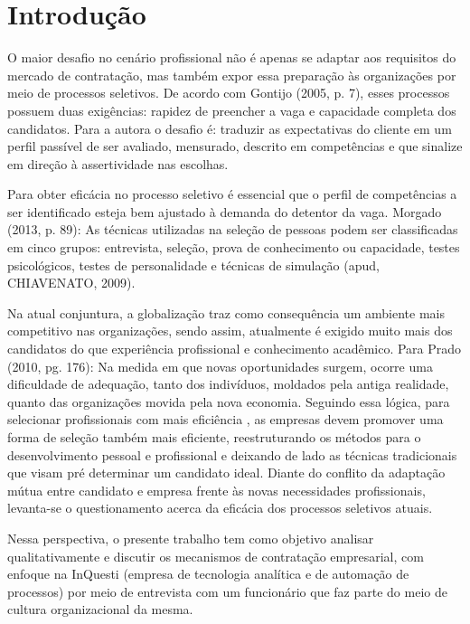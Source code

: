 
\chapter[Introdução]{Introdução}
O maior desafio no cenário profissional não é apenas se adaptar aos requisitos do mercado de contratação, mas também expor essa preparação às organizações por meio de processos seletivos.
De acordo com Gontijo (2005, p. 7), esses processos possuem duas exigências: rapidez de preencher a vaga e capacidade completa dos candidatos. Para a autora o desafio é:
traduzir as expectativas do cliente em um perfil passível de ser avaliado, mensurado, descrito em competências e que sinalize em direção à assertividade nas escolhas.

Para obter eficácia no processo seletivo é essencial que o perfil de competências a ser identificado esteja bem ajustado à demanda do detentor da vaga.
Morgado (2013, p. 89): 
As técnicas utilizadas na seleção de pessoas podem ser classificadas em cinco grupos: entrevista, seleção, prova de conhecimento ou capacidade, testes psicológicos, testes de personalidade e técnicas de simulação (apud, CHIAVENATO, 2009).

Na atual conjuntura, a globalização traz como consequência um ambiente mais competitivo nas organizações, sendo assim, atualmente é exigido muito mais dos candidatos do que experiência profissional e conhecimento acadêmico. Para Prado (2010, pg. 176): Na medida em que novas oportunidades surgem, ocorre uma dificuldade de adequação, tanto dos indivíduos, moldados pela antiga realidade, quanto das organizações movida pela nova economia.
Seguindo essa lógica, para selecionar profissionais com mais eficiência , as empresas devem promover uma forma de seleção também mais eficiente, reestruturando os métodos para o desenvolvimento pessoal e profissional e deixando de lado as técnicas tradicionais que visam pré determinar um candidato ideal.
Diante do conflito da adaptação mútua entre candidato e empresa frente às novas necessidades profissionais, levanta-se o questionamento acerca da eficácia dos processos seletivos atuais. 

Nessa perspectiva, o presente trabalho tem como objetivo analisar qualitativamente e discutir os mecanismos de contratação empresarial, com enfoque na InQuesti (empresa de tecnologia analítica e de automação de processos) por meio de entrevista com um funcionário que faz parte do meio de cultura organizacional da mesma.
